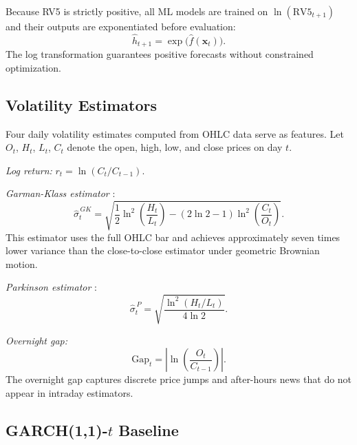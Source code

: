 \documentclass[12pt]{article}
\begin{document}
Because RV5 is strictly positive, all ML models are trained on
$\ln(\text{RV5}_{t+1})$ and their outputs are exponentiated before evaluation:
\begin{equation}
  \hat{h}_{t+1} = \exp\!\bigl(\hat{f}(\mathbf{x}_{t})\bigr).
  \label{eq:logvol}
\end{equation}
The log transformation guarantees positive forecasts without constrained
optimization.

\subsection{Volatility Estimators}

Four daily volatility estimates computed from OHLC data serve as features.
Let $O_{t}$, $H_{t}$, $L_{t}$, $C_{t}$ denote the open, high, low, and
close prices on day $t$.

\smallskip\noindent\textit{Log return:}
$r_{t} = \ln(C_{t}/C_{t-1})$.

\smallskip\noindent\textit{Garman-Klass estimator} \citep{GarmanKlass1980}:
\begin{equation}
  \hat{\sigma}_{t}^{\,GK} =
    \sqrt{\frac{1}{2}\ln^{2}\!\left(\frac{H_{t}}{L_{t}}\right)
          - (2\ln 2 - 1)\ln^{2}\!\left(\frac{C_{t}}{O_{t}}\right)}.
  \label{eq:gk}
\end{equation}
This estimator uses the full OHLC bar and achieves approximately seven times
lower variance than the close-to-close estimator under geometric Brownian
motion.

\smallskip\noindent\textit{Parkinson estimator} \citep{Parkinson1980}:
\begin{equation}
  \hat{\sigma}_{t}^{\,P} =
    \sqrt{\frac{\ln^{2}(H_{t}/L_{t})}{4\ln 2}}.
  \label{eq:park}
\end{equation}

\smallskip\noindent\textit{Overnight gap:}
\begin{equation}
  \text{Gap}_{t} = \left|\ln\!\left(\frac{O_{t}}{C_{t-1}}\right)\right|.
  \label{eq:gap}
\end{equation}
The overnight gap captures discrete price jumps and after-hours news that do
not appear in intraday estimators.

\subsection{GARCH(1,1)-\texorpdfstring{$t$}{t} Baseline}
\label{sec:garch}
\end{document}
